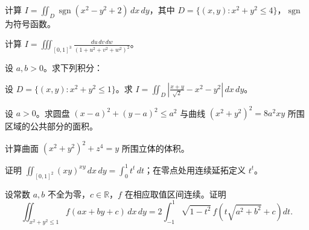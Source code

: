 \noindent\begin{minipage}{\textwidth}
计算 $\displaystyle I=\iint_D\operatorname{sgn}(x^2-y^2+2)\,dx\,dy$，其中 $D=\{(x,y):x^2+y^2\le4\}$，$\operatorname{sgn}$ 为符号函数。
\end{minipage}\par\vfill
\noindent\begin{minipage}{\textwidth}
计算 $\displaystyle I=\iiint_{[0,1]^3}\frac{du\,dv\,dw}{(1+u^2+v^2+w^2)^2}$。
\end{minipage}\par\vfill
\noindent\begin{minipage}{\textwidth}
设 $a,b>0$。求下列积分：
\end{minipage}\par\vfill
\newpage
\noindent\begin{minipage}{\textwidth}
设 $D=\{(x,y):x^2+y^2\le1\}$。求 $\displaystyle I=\iint_D\left|\frac{x+y}{\sqrt2}-x^2-y^2\right|\,dx\,dy$。
\end{minipage}\par\vfill
\noindent\begin{minipage}{\textwidth}
设 $a>0$。求圆盘 $(x-a)^2+(y-a)^2\le a^2$ 与曲线 $(x^2+y^2)^2=8a^2xy$ 所围区域的公共部分的面积。
\end{minipage}\par\vfill
\noindent\begin{minipage}{\textwidth}
计算曲面 $(x^2+y^2)^2+z^4=y$ 所围立体的体积。
\end{minipage}\par\vfill
\noindent\begin{minipage}{\textwidth}
证明 $\displaystyle\iint_{[0,1]^2}(xy)^{xy}\,dx\,dy=\int_0^1t^t\,dt$；在零点处用连续延拓定义 $t^t$。
\end{minipage}\par\vfill
\newpage
\noindent\begin{minipage}{\textwidth}
设常数 $a,b$ 不全为零，$c\in\mathbb R$，$f$ 在相应取值区间连续。证明\[\iint_{x^2+y^2\le1}f(ax+by+c)\,dx\,dy=2\int_{-1}^{1}\sqrt{1-t^2}\,f\!\left(t\sqrt{a^2+b^2}+c\right)dt.\]
\end{minipage}\par\vfill
